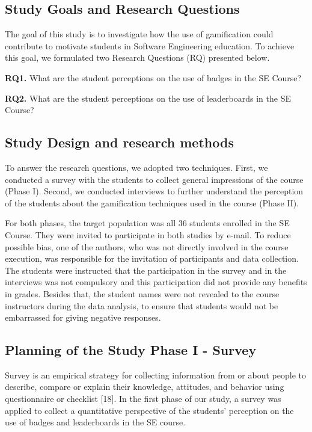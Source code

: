 \subsection{Study Goals and Research Questions}

The goal of this study is to investigate how the use of gamification could contribute to motivate students in Software Engineering education. To achieve this goal, we formulated two Research Questions (RQ) presented below.

\textbf{RQ1.} What are the student perceptions on the use of badges in the SE Course?

\textbf{RQ2.} What are the student perceptions on the use of leaderboards in the SE Course?

\subsection{Study Design and research methods}

To answer the research questions, we adopted two techniques. First, we conducted a survey with the students to collect general impressions of the course (Phase I). Second, we conducted interviews to further understand the perception of the students about the gamification techniques used in the course (Phase II).

For both phases, the target population was all 36 students enrolled in the SE Course. They were invited to participate in both studies by e-mail. To reduce possible bias, one of the authors, who was not directly involved in the course execution, was responsible for the invitation of participants and data collection. The students were instructed that the participation in the survey and in the interviews was not compulsory and this participation did not provide any benefits in grades. Besides that, the student names were not revealed to the course instructors during the data analysis, to ensure that students would not be embarrassed for giving negative responses.

\subsection{Planning of the Study Phase I - Survey}

Survey is an empirical strategy for collecting information from or about people to describe, compare or explain their knowledge, attitudes, and behavior using questionnaire or checklist [18]. In the first phase of our study, a survey was applied to collect a quantitative perspective of the students’ perception on the use of badges and leaderboards in the SE course. 

